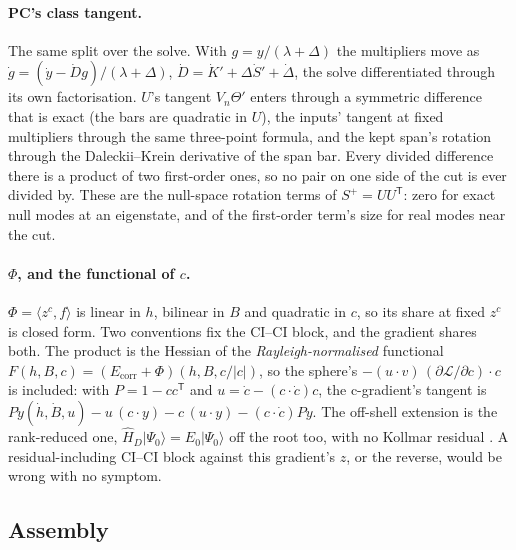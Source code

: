 \documentclass[11pt]{article}
\newcommand{\Lag}{\mathcal L}
\newcommand{\Ecorr}{E_{\mathrm{corr}}}
\newcommand{\T}{\mathsf T}
\begin{document}
\paragraph{PC's class tangent.} The same split over the solve. With
$g = y/(\lambda + \Delta)$ the multipliers move as
$\dot g = (\dot y - \dot D g)/(\lambda + \Delta)$,
$\dot D = \dot K' + \Delta\dot S' + \dot\Delta$, the solve differentiated
through its own factorisation. $U$'s tangent $V_n\Theta'$ enters through a
symmetric difference that is exact (the bars are quadratic in $U$), the
inputs' tangent at fixed multipliers through the same three-point formula,
and the kept span's rotation through the Daleckii--Krein derivative of the
span bar. Every divided difference there is a product of two first-order
ones, so no pair on one side of the cut is ever divided by. These are the
null-space rotation terms of $S^+ = UU^\T$: zero for exact null modes at an
eigenstate, and of the first-order term's size for real modes near the cut.

\paragraph{$\Phi$, and the functional of $c$.} $\Phi = \langle z^c,
f\rangle$ is linear in $h$, bilinear in $B$ and quadratic in $c$, so its
share at fixed $z^c$ is closed form. Two conventions fix the CI--CI block,
and the gradient shares both. The product is the Hessian of the
\emph{Rayleigh-normalised} functional $F(h, B, c) = (\Ecorr + \Phi)(h, B,
c/|c|)$, so the sphere's $-(u\cdot v)\,(\partial\Lag/\partial c)\cdot c$ is
included: with $P = 1 - cc^\T$ and $u = \dot c - (c\cdot\dot c)c$, the
c-gradient's tangent is
$P\dot y(\dot h, \dot B, u) - u\,(c\cdot y) - c\,(u\cdot y) - (c\cdot\dot c)Py$.
The off-shell extension is the rank-reduced one, $\hat H_D|\Psi_0\rangle =
E_0|\Psi_0\rangle$ off the root too, with no Kollmar residual
\cite{kollmar2021}. A residual-including CI--CI block against this
gradient's $z$, or the reverse, would be wrong with no symptom.

\subsection{Assembly}
\label{sec:hess-assembly}
\end{document}
